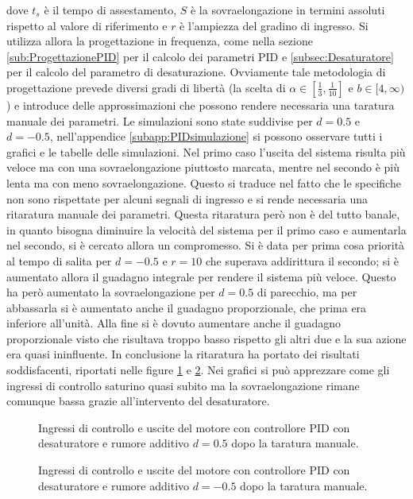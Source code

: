 		\noindent dove $t_s$ è il tempo di assestamento, $S$ è la sovraelongazione in termini assoluti rispetto al valore di
		riferimento e $r$ è l'ampiezza del gradino di ingresso. Si utilizza allora la progettazione in frequenza, come nella sezione \ref{sub:ProgettazionePID} per il calcolo dei parametri PID e \ref{subsec:Desaturatore} per il calcolo del parametro di desaturazione. Ovviamente tale metodologia di progettazione prevede diversi gradi di libertà (la scelta di $\alpha \in [\frac{1}{3},\frac{1}{10}]
		$ e $b \in [4, \infty)$) e introduce delle approssimazioni che possono rendere necessaria una taratura manuale dei parametri. Le simulazioni sono state suddivise per $d=0.5$ e $d=-0.5$, nell'appendice \ref{subapp:PIDsimulazione} si possono osservare tutti i grafici e le tabelle delle simulazioni. Nel primo caso l'uscita del sistema risulta più veloce ma con una sovraelongazione piuttosto marcata, mentre nel secondo è più lenta ma con meno sovraelongazione. Questo si traduce nel fatto che le specifiche non sono rispettate per alcuni segnali di ingresso e si rende necessaria una ritaratura manuale dei parametri. Questa ritaratura però non è del tutto banale, in quanto bisogna diminuire la velocità del sistema per il primo caso e aumentarla nel secondo, si è cercato allora un compromesso. Si è data per prima cosa priorità al tempo di salita per $d=-0.5$ e $r=10$ che superava addirittura il secondo; si è aumentato allora il guadagno integrale per rendere il sistema più veloce. Questo ha però aumentato la sovraelongazione per $d=0.5$ di parecchio, ma per abbassarla si è aumentato anche il guadagno proporzionale, che prima era inferiore all'unità. Alla fine si è dovuto aumentare anche il guadagno proporzionale visto che risultava troppo basso rispetto gli altri due e la sua azione era quasi ininfluente. In conclusione la ritaratura ha portato dei risultati soddisfacenti, riportati nelle figure \ref{fig:PIDd_0_5} e \ref{fig:PIDd__0_5}. Nei grafici si può apprezzare come gli ingressi di controllo saturino quasi subito ma la sovraelongazione rimane comunque bassa grazie all'intervento del desaturatore.
		
		\begin{figure}[H]
			\centering
			 
			\caption{Ingressi di controllo e uscite del motore con controllore PID con desaturatore e rumore additivo $d=0.5$ dopo la taratura manuale.}
			\label{fig:PIDd_0_5}
		\end{figure}
		
		\begin{figure}[H]
			\centering
			 
			\caption{Ingressi di controllo e uscite del motore con controllore PID con desaturatore e rumore additivo $d=-0.5$ dopo la taratura manuale.}
			\label{fig:PIDd__0_5}		
		\end{figure}		
		
